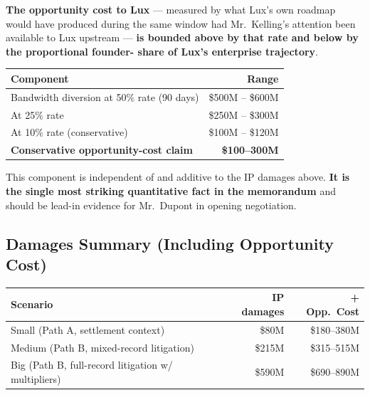 \documentclass[11pt,letterpaper]{article}
\begin{document}
\textbf{The opportunity cost to Lux} --- measured by what Lux's own
roadmap would have produced during the same window had Mr.\
Kelling's attention been available to Lux upstream --- \textbf{is
bounded above by that rate and below by the proportional founder-
share of Lux's enterprise trajectory}.

\begin{center}
\begin{tabular}{lr}
\toprule
\textbf{Component} & \textbf{Range} \\
\midrule
Bandwidth diversion at 50\% rate (90 days) & \$500M -- \$600M \\
At 25\% rate & \$250M -- \$300M \\
At 10\% rate (conservative) & \$100M -- \$120M \\
\midrule
\textbf{Conservative opportunity-cost claim} & \textbf{\$100--300M} \\
\bottomrule
\end{tabular}
\end{center}

This component is independent of and additive to the IP damages
above. \textbf{It is the single most striking quantitative fact in
the memorandum} and should be lead-in evidence for Mr.\ Dupont in
opening negotiation.

\subsection*{Damages Summary (Including Opportunity Cost)}

\begin{center}
\begin{tabular}{lrr}
\toprule
\textbf{Scenario} & \textbf{IP damages} & \textbf{+ Opp.\ Cost} \\
\midrule
Small (Path A, settlement context) & \$80M & \$180--380M \\
Medium (Path B, mixed-record litigation) & \$215M & \$315--515M \\
Big (Path B, full-record litigation w/ multipliers) & \$590M & \$690--890M \\
\bottomrule
\end{tabular}
\end{center}
\end{document}
